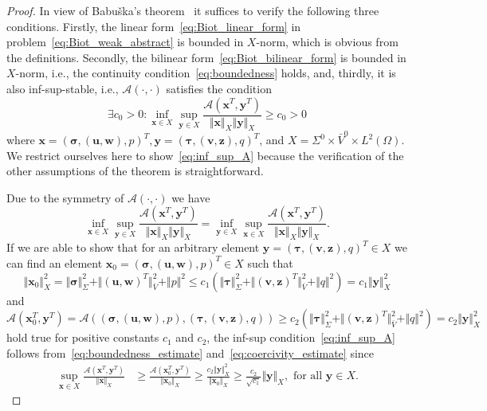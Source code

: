 \documentclass[11pt]{amsart}
\theoremstyle{remark}
\theoremstyle{definition}
\def\sig{{\bm \sigma}}
\def\bu{{\boldsymbol u}}
\def\bv{{\boldsymbol v}}
\def\bw{{\boldsymbol w}}
\def\tbx{{\bx}}
\def\tsig{\sig}
\def\tbu{{\bu}}
\def\tbw{{\bw}}
\def\tp{{p}}
\def\sig{\boldsymbol \sigma}
\def\bu{\boldsymbol u}
\def\bv{\boldsymbol v}
\def\bw{\boldsymbol w}
\def\bx{\boldsymbol x}
\def\by{\boldsymbol y}
\def\bz{\boldsymbol z}
\begin{document}
%
\begin{proof}
In view of Babu\v{s}ka's theorem~\cite{Babuska1971error} { it suffices to verify the following three conditions. Firstly, the linear form~\eqref{eq:Biot_linear_form} in problem~\eqref{eq:Biot_weak_abstract} is bounded in $X$-norm, which is obvious from the definitions. Secondly,  the bilinear form~\eqref{eq:Biot_bilinear_form} is bounded in $X$-norm, i.e., the continuity condition~\eqref{eq:boundedness} holds, and, thirdly, it is also inf-sup-stable, i.e.,  $\mathcal A (\cdot,\cdot)$ satisfies the condition}
%
\begin{equation}\label{eq:inf_sup_A}
\exists c_0 > 0: \inf_{\bx \in X} \sup_{\by \in X} \frac{\mathcal{A}(\bx^T,\by^T)}{\Vert \bx \Vert_{X} \Vert \by \Vert_{X}} \ge c_0 > 0
\end{equation}
where $\bx = (\sig,(\bu,\bw),p)^T, \by = (\bm \tau,(\bv,\bz),q)^T$, and $X= \Sigma^0 \times \bar{V}^0 \times L^2(\Omega)$.
We restrict ourselves here to show~\eqref{eq:inf_sup_A} because the verification of the other assumptions of the theorem is straightforward.

Due to the symmetry of $\mathcal A (\cdot,\cdot)$ we have
$$
\inf_{\bx \in X} \sup_{\by \in X} \frac{\mathcal{A}(\bx^T,\by^T)}{\Vert \bx \Vert_{X} \Vert \by \Vert_{X}}
= \inf_{\by \in X} \sup_{\bx \in X} \frac{\mathcal{A}(\bx^T,\by^T)}{\Vert \bx \Vert_{X} \Vert \by \Vert_{X}} .
$$
{
If we are able to show that for an arbitrary element $\by = (\bm \tau,(\bv,\bz),q)^T \in X$ we can find
an element $\tbx_0 = (\tsig,(\tbu,\tbw), \tp)^T \in X$ such that
%
\begin{equation}\label{eq:boundedness_estimate}
\Vert \tbx_0  \Vert_X^2 =
\Vert \tsig \Vert_\Sigma^2 + \Vert (\tbu,\tbw)^T \Vert_{\bar{V}}^2 + \Vert \tp \Vert^2 
\le c_1 (\Vert \bm \tau \Vert_\Sigma^2 + \Vert (\bv,\bz)^T \Vert_{\bar{V}}^2 + \Vert q \Vert^2)
= c_1 \Vert \by  \Vert_X^2
\end{equation}
%
and
%
\begin{equation}\label{eq:coercivity_estimate}
\mathcal A (\tbx_0^T,\by^T) 
=
\mathcal A ((\tsig,(\tbu,\tbw),\tp),(\bm \tau,(\bv,\bz),q)) 
\ge c_2 (\Vert \bm \tau \Vert_\Sigma^2 + \Vert (\bv,\bz)^T \Vert_{\bar{V}}^2 + \Vert q \Vert^2) 
= c_2 \Vert \by  \Vert_X^2
\end{equation}
%
hold true for positive constants $c_{1}$ and $c_{2}$, the inf-sup condition~\eqref{eq:inf_sup_A} follows
from~\eqref{eq:boundedness_estimate} and~\eqref{eq:coercivity_estimate} since
%
\begin{align}\label{eq:continuous_inf_sup}
\sup_{\bx \in X} \frac{\mathcal{A}(\bx^T,\by^T)}{\Vert \bx \Vert_{X}}
& \ge  \frac{\mathcal{A}(\tbx_0^T,\by^T)}{\Vert \tbx_0 \Vert_{X}}
\ge \frac{c_2 \Vert \by \Vert_{X}^2}{\Vert \tbx_0 \Vert_{X}}
\ge \frac{c_2}{\sqrt{c_1}} \Vert \by \Vert_{X} , \mbox{ for all } \by \in X .
\end{align}
}


\end{proof}
\end{document}
